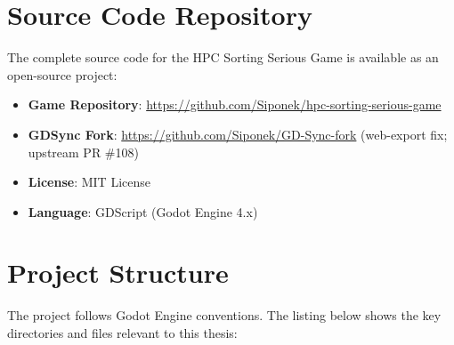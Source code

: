
\section{Source Code Repository}
\label{app:b:repository}

The complete source code for the HPC Sorting Serious Game is available as an open-source project:

\begin{itemize}
    \item \textbf{Game Repository}: \url{https://github.com/Siponek/hpc-sorting-serious-game}
    \item \textbf{GDSync Fork}: \url{https://github.com/Siponek/GD-Sync-fork} (web-export fix; upstream PR \#108)
    \item \textbf{License}: MIT License
    \item \textbf{Language}: GDScript (Godot Engine 4.x)
\end{itemize}

\section{Project Structure}
\label{app:b:structure}

The project follows Godot Engine conventions. The listing below shows the key directories and files relevant to this thesis:


